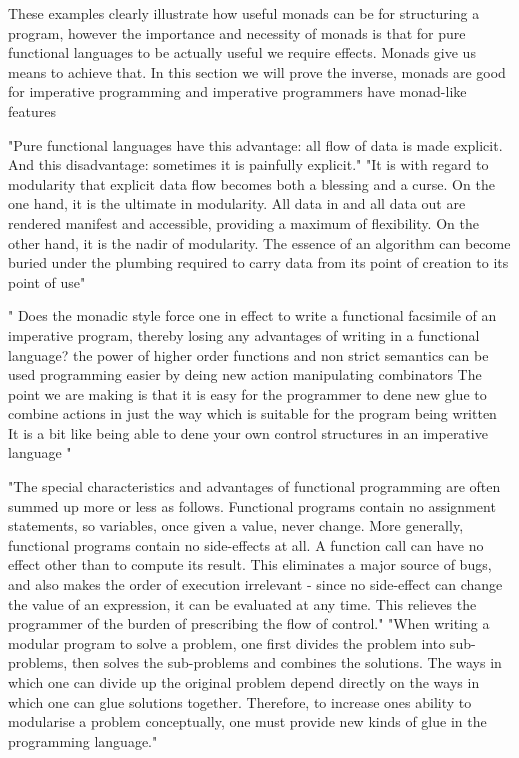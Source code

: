 These examples clearly illustrate how useful monads can be for structuring a program,
however the importance and necessity of monads is that for pure functional languages
to be actually useful we require effects. Monads give us means to achieve that.
In this section we will prove the inverse,
monads are good for imperative programming
and imperative programmers have monad-like features

"Pure functional languages have this advantage:
all flow of data is made explicit. And this disadvantage: sometimes it is painfully explicit."
"It is with regard to modularity that explicit data flow becomes both a blessing and a curse.
On the one hand, it is the ultimate in modularity.
All data in and all data out are rendered manifest and accessible, providing a maximum of flexibility. On the other hand, it is the nadir of modularity. The essence of an algorithm can become buried under the plumbing required to carry data from its point of creation to its point of use"
\cite{wadler1995monads}

"
Does the monadic style force one in effect to write a functional facsimile of an
imperative program, thereby losing any advantages of writing in a functional language?
the power of higher order functions and non strict semantics can be used
programming easier by deing new action manipulating combinators
The point we are making is that it is easy for the programmer to dene new glue to
combine actions in just the way which is suitable for the program being written
It is a bit like being able to dene your own control structures in an imperative language
"\cite{PeytonJones:1993}

"The special characteristics and advantages of functional programming are often summed up more or less as follows.
Functional programs contain no assignment statements, so variables,
once given a value, never change.
More generally, functional programs contain no side-effects at all.
A function call can have no effect other than to compute its result.
This eliminates a major source of bugs,
and also makes the order of execution irrelevant - since no side-effect
can change the value of an expression,
it can be evaluated at any time.
This relieves the programmer of the burden of prescribing the flow of control."
"When writing a modular program to solve a problem, one first divides the problem into sub- problems, then solves the sub-problems and combines the solutions. The ways in which one can divide up the original problem depend directly on the ways in which one can glue solutions together. Therefore, to increase ones ability to modularise a problem conceptually, one must provide new kinds of glue in the programming language."
\cite{hughes1989functional}

